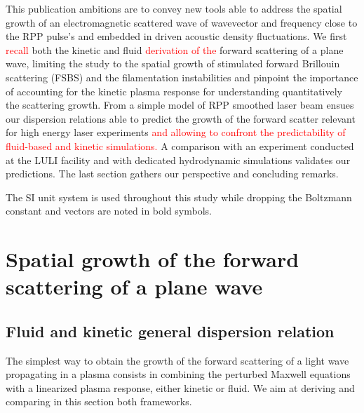 \documentclass[
 reprint,
 superscriptaddress,
 amsmath,amssymb,
 aps,
]{revtex4-1}
\def\tc{\textcolor{red}}
\begin{document}
This publication ambitions are to convey new tools 
able to address  the spatial growth of an electromagnetic scattered wave of wavevector and frequency close to the RPP pulse's and embedded in driven acoustic density fluctuations.
We first \tc{recall} both the kinetic and fluid \tc{derivation of the} forward scattering of a plane wave, limiting the study to the spatial  growth of  stimulated forward Brillouin scattering (FSBS) and the filamentation instabilities and pinpoint the importance of accounting for the kinetic plasma response for understanding quantitatively the scattering growth.
From  a simple model of RPP smoothed laser beam ensues our dispersion relations  able to predict the growth of the forward scatter relevant for high energy laser experiments \tc{and allowing to confront the predictability of fluid-based and kinetic simulations.} 
A comparison with an experiment conducted at the LULI facility and  with dedicated hydrodynamic simulations validates our predictions.
The last section gathers our perspective and concluding remarks. 

The SI unit system is used throughout this study while dropping the Boltzmann constant and vectors are noted in bold symbols. 

\section{Spatial growth of the  forward scattering of a plane wave}\label{sec:plane}
\subsection{Fluid and kinetic general dispersion relation}
The simplest way to obtain the growth of the forward scattering of a light wave propagating in a plasma consists  in combining the perturbed Maxwell equations with a linearized plasma response, either kinetic or fluid.
We aim at deriving and comparing in this section both frameworks.
\end{document}
